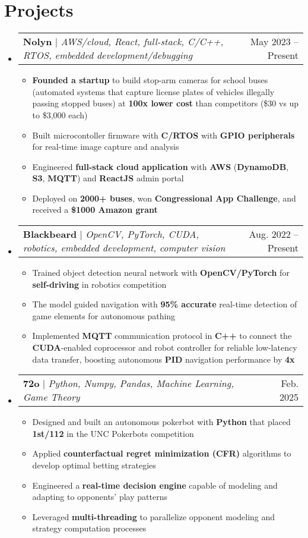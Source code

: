 \documentclass[letterpaper,11pt]{article}
\makeatletter
\newcommand{\resumeItem}[1]{
  \item\small{
    {#1 \vspace{-2pt}}}
}
\newcommand{\resumeProjectHeading}[2]{
    \item
    \begin{tabular*}{0.97\textwidth}{l@{\extracolsep{\fill}}r}
      \small#1 & #2 \\
    \end{tabular*}\vspace{-7pt}
}
\newcommand{\resumeSubHeadingListStart}{\begin{itemize}[leftmargin=0.15in, label={}]}
\newcommand{\resumeSubHeadingListEnd}{\end{itemize}}
\newcommand{\resumeItemListStart}{\begin{itemize}}
\newcommand{\resumeItemListEnd}{\end{itemize}\vspace{-5pt}}
\makeatother
\begin{document}
\section{Projects}
    \resumeSubHeadingListStart
      \resumeProjectHeading
          {\textbf{Nolyn} $|$ \emph{AWS/cloud, React, full-stack, C/C++, RTOS, embedded development/debugging}}{May 2023 -- Present}
          \resumeItemListStart
            \resumeItem{\textbf{Founded a startup} to build stop-arm cameras for school buses (automated systems that capture license plates of vehicles illegally passing stopped buses) at \textbf{100x lower cost} than competitors (\$30 vs up to \$3,000 each)}
            \resumeItem{Built microcontoller firmware with \textbf{C/RTOS} with \textbf{GPIO peripherals} for real-time image capture and analysis}
            \resumeItem{Engineered \textbf{full-stack cloud application} with \textbf{AWS} (\textbf{DynamoDB}, \textbf{S3}, \textbf{MQTT}) and \textbf{ReactJS} admin portal}
            \resumeItem{Deployed on \textbf{2000+ buses}, won \textbf{Congressional App Challenge}, and received a \textbf{\$1000 Amazon grant}}
          \resumeItemListEnd
      \vspace{-4pt}
      \resumeProjectHeading
        {\textbf{Blackbeard} $|$ \emph{OpenCV, PyTorch, CUDA, robotics, embedded development, computer vision}}{Aug. 2022 -- Present}
        \resumeItemListStart
          \resumeItem{Trained object detection neural network with \textbf{OpenCV/PyTorch} for \textbf{self-driving} in robotics competition}
          \resumeItem{The model guided navigation with \textbf{95\% accurate} real-time detection of game elements for autonomous pathing}
          \resumeItem{Implemented \textbf{MQTT} communication protocol in \textbf{C++} to connect the \textbf{CUDA}-enabled coprocessor and robot controller for reliable low-latency data transfer, boosting autonomous \textbf{PID} navigation performance by \textbf{4x}}
        \resumeItemListEnd
        \vspace{-4pt}
        \resumeProjectHeading
          {\textbf{72o} $|$ \emph{Python, Numpy, Pandas, Machine Learning, Game Theory}}{Feb. 2025}
          \resumeItemListStart
            \resumeItem{Designed and built an autonomous pokerbot with \textbf{Python} that placed \textbf{1st/112} in the UNC Pokerbots competition}
            \resumeItem{Applied \textbf{counterfactual regret minimization (CFR)} algorithms to develop optimal betting strategies}
            \resumeItem{Engineered a \textbf{real-time decision engine} capable of modeling and adapting to opponents' play patterns}
            \resumeItem{Leveraged \textbf{multi-threading} to parallelize opponent modeling and strategy computation processes}
          \resumeItemListEnd
    \resumeSubHeadingListEnd
\end{document}

